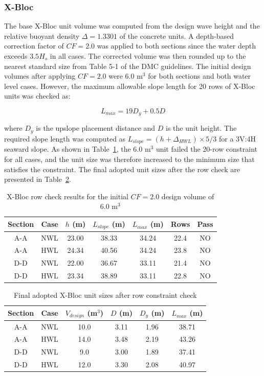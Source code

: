 \documentclass[a4paper, 11pt]{article}
\begin{document}
\subsubsection{X-Bloc}
\hspace{0.5cm}The base X-Bloc unit volume was computed from the design wave height and the relative buoyant density $\Delta = 1.3301$ of the concrete units. A depth-based correction factor of $CF = 2.0$ was applied to both sections since the water depth exceeds $3.5 H_{s}$ in all cases. The corrected volume was then rounded up to the nearest standard size from Table 5-1 of the DMC guidelines. The initial design volumes after applying $CF = 2.0$ were 6.0 m$^{3}$ for both sections and both water level cases. However, the maximum allowable slope length for 20 rows of X-Bloc units was checked as:

\begin{equation}
L_{max} = 19 D_{y} + 0.5 D
\end{equation}

where $D_{y}$ is the upslope placement distance and $D$ is the unit height. The required slope length was computed as $L_{slope} = (h + \Delta_{HWL}) \times 5/3$ for a 3V:4H seaward slope. As shown in Table~\ref{tab:rowcheck}, the 6.0 m$^{3}$ unit failed the 20-row constraint for all cases, and the unit size was therefore increased to the minimum size that satisfies the constraint. The final adopted unit sizes after the row check are presented in Table~\ref{tab:xblocsize}.

\begin{table}[H]
\centering
\caption{X-Bloc row check results for the initial $CF = 2.0$ design volume of 6.0 m$^{3}$}
\label{tab:rowcheck}
\begin{tabular}{ccccccc}
\hline
Section & Case & $h$ (m) & $L_{slope}$ (m) & $L_{max}$ (m) & Rows & Pass \\
\hline
A-A & NWL & 23.00 & 38.33 & 34.24 & 22.4 & NO \\
A-A & HWL & 24.34 & 40.56 & 34.24 & 23.8 & NO \\
D-D & NWL & 22.00 & 36.67 & 33.11 & 21.4 & NO \\
D-D & HWL & 23.34 & 38.89 & 33.11 & 22.8 & NO \\
\hline
\end{tabular}
\end{table}

\begin{table}[H]
\centering
\caption{Final adopted X-Bloc unit sizes after row constraint check}
\label{tab:xblocsize}
\begin{tabular}{cccccc}
\hline
Section & Case & $V_{design}$ (m$^{3}$) & $D$ (m) & $D_{y}$ (m) & $L_{max}$ (m) \\
\hline
A-A & NWL & 10.0 & 3.11 & 1.96 & 38.71 \\
A-A & HWL & 14.0 & 3.48 & 2.19 & 43.26 \\
D-D & NWL & 9.0  & 3.00 & 1.89 & 37.41 \\
D-D & HWL & 12.0 & 3.30 & 2.08 & 40.97 \\
\hline
\end{tabular}
\end{table}
\end{document}
